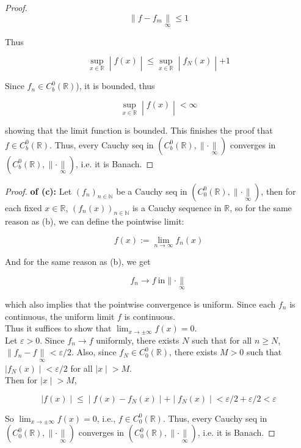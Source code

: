 \begin{proof}
\[\parallel f - f_{m}\underset{\infty}{\parallel} \leq 1\]

Thus

\[\left. \sup\limits_{x \in \mathbb{R}} \middle| f(x) \middle| \leq \sup\limits_{x \in \mathbb{R}} \middle| f_{N}(x) \middle| + 1 \right.\]

Since \(f_{n} \in C_{b}^{0}(\mathbb{R})\)), it is bounded, thus

\[\left. \sup\limits_{x \in \mathbb{R}} \middle| f(x) \middle| < \infty \right.\]

showing that the limit function is bounded. This finishes the proof that \(f \in C_{b}^{0}(\mathbb{R})\). Thus, every Cauchy seq in \((C_{b}^{0}(\mathbb{R}), \parallel \cdot \underset{\infty}{\parallel})\) converges in \((C_{b}^{0}(\mathbb{R}), \parallel \cdot \underset{\infty}{\parallel})\), i.e. it is Banach.

\end{proof}

\begin{proof}

\textbf{of (c):} Let \((f_{n})_{n \in \mathbb{N}}\) be a Cauchy seq in \((C_{0}^{0}(\mathbb{R}), \parallel \cdot \underset{\infty}{\parallel})\), then for each fixed \(x \in \mathbb{R}\), \((f_{n}(x))_{n \in \mathbb{N}}\) is a Cauchy sequence in \(\mathbb{R}\), so for the same reason as (b), we can define the pointwise limit:

\[f(x) := \lim\limits_{n\rightarrow\infty}f_{n}(x)\]

And for the same reason as (b), we get

\[f_{n}\rightarrow f\ \text{in} \parallel \cdot \underset{\infty}{\parallel}\]

which also implies that the pointwise convergence is uniform. Since each \(f_{n}\) is continuous, the uniform limit \(f\) is continuous.\\
Thus it suffices to show that \(\lim_{x\rightarrow \pm \infty}f(x) = 0\).\\
Let \(\varepsilon > 0\). Since \(f_{n}\rightarrow f\) uniformly, there exists \(N\) such that for all \(n \geq N\), \(\parallel f_{n} - f\underset{\infty}{\parallel} < \varepsilon/2\). Also, since \(f_{N} \in C_{0}^{0}(\mathbb{R})\), there exists \(M > 0\) such that \(\left. |f_{N}(x) \middle| < \varepsilon/2 \right.\) for all \(\left. |x \middle| > M \right.\).\\
Then for \(\left. |x \middle| > M \right.\),

\[\left. |f(x) \middle| \leq \middle| f(x) - f_{N}(x) \middle| + \middle| f_{N}(x) \middle| < \varepsilon/2 + \varepsilon/2 < \varepsilon \right.\]

So \(\lim_{x\rightarrow \pm \infty}f(x) = 0\), i.e., \(f \in C_{0}^{0}(\mathbb{R})\). Thus, every Cauchy seq in \((C_{0}^{0}(\mathbb{R}), \parallel \cdot \underset{\infty}{\parallel})\) converges in \((C_{0}^{0}(\mathbb{R}), \parallel \cdot \underset{\infty}{\parallel})\), i.e. it is Banach.

\end{proof}

